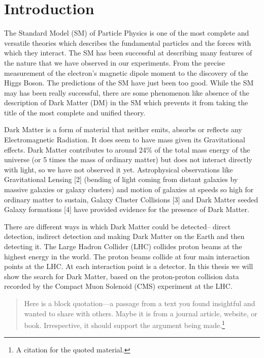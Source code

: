 \chapter{Introduction}
\label{chapter:introduction}


The Standard Model (SM) of Particle Physics is one of the most complete and versatile theories which describes the fundamental particles and the forces with which they interact. The SM has been successful at describing many features of the nature that we have observed in our experiments. From the precise measurement of the electron's magnetic dipole moment to the discovery of the Higgs Boson. The predictions of the SM have just been too good. While the SM may has been really successful, there are some phenomenon like absence of the description of Dark Matter (DM) in the SM which prevents it from taking the title of the most complete and unified theory.

Dark Matter  is a form of material that neither emits, absorbs or reflects any Electromagnetic Radiation. It does seem to have mass given its Gravitational effects. Dark Matter contributes to around 24\% of the total mass energy of the universe (or 5 times the mass of ordinary matter) but does not interact directly with light, so we have not observed it yet. Astrophysical observations like Gravitational Lensing [2] (bending of light coming from distant galaxies by massive galaxies or galaxy clusters) and motion of galaxies at speeds so high for ordinary matter to sustain, Galaxy Cluster Collisions [3] and Dark Matter seeded Galaxy formations [4] have provided evidence for the presence of Dark Matter.

There are different ways in which Dark Matter could be detected-- direct detection, indirect detection and making Dark Matter on the Earth and then detecting it. The Large Hadron Collider (LHC) collides proton beams at the highest energy in the world. The proton beams collide at four main interaction points at the LHC. At each interaction point is a detector. In this thesis we will show the search for Dark Matter, based on the proton-proton collision data recorded by the Compact Muon Solenoid (CMS) experiment at the LHC.



\begin{quotation}
    \noindent Here is a block quotation---a passage from a text you found insightful and wanted to share with others. Maybe it is from a journal article, website, or book. Irrespective, it should support the argument being made.\footnote{A citation for the quoted material.}
\end{quotation}

